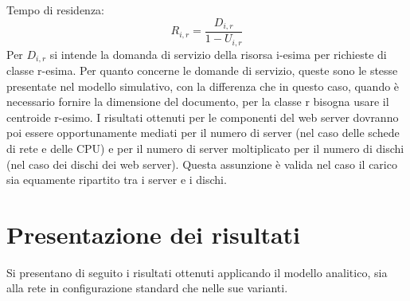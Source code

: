 Tempo di residenza:
$$R_{i,r} = \frac{D_{i,r}}{1 - U_{i,r}}$$
Per $D_{i,r}$ si intende la domanda di servizio della risorsa i-esima per richieste di classe r-esima. Per quanto concerne le domande di servizio, queste sono le stesse presentate nel modello simulativo, con la differenza che in questo caso, quando è necessario fornire la dimensione del documento, per la classe r bisogna usare il centroide r-esimo. I risultati ottenuti per le componenti del web server dovranno poi essere opportunamente mediati per il numero di server (nel caso delle schede di rete e delle CPU) e per il numero di server moltiplicato per il numero di dischi (nel caso dei dischi dei web server). Questa assunzione è valida nel caso il carico sia equamente ripartito tra i server e i dischi.
\section{Presentazione dei risultati}
Si presentano di seguito i risultati ottenuti applicando il modello analitico, sia alla rete in configurazione standard che nelle sue varianti.
